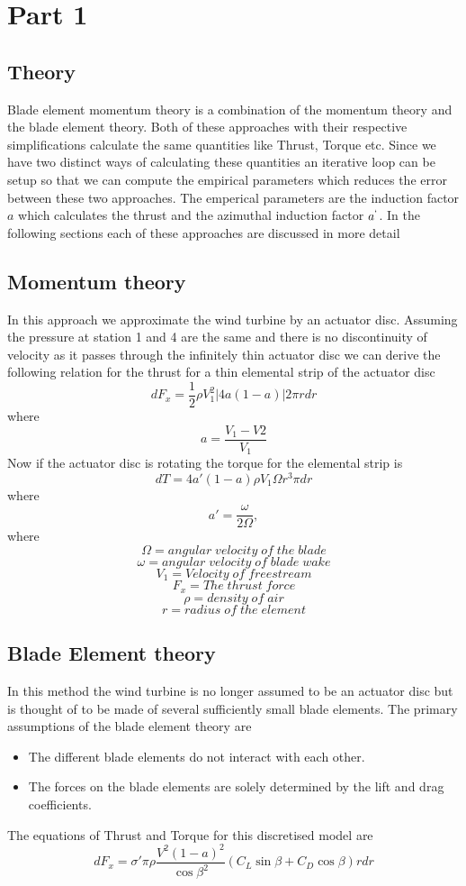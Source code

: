 \documentclass[main.tex]{subfiles}
\begin{document}
\section{Part 1}
\subsection{Theory}
Blade element momentum theory is a combination of the momentum theory and the blade element theory.
Both of these approaches with their respective simplifications calculate the same quantities like Thrust, Torque etc. Since we have two distinct ways of calculating these quantities an iterative loop can be setup so that we can compute the empirical parameters which reduces the error between these two approaches. The emperical parameters are the induction factor $a$ which calculates the thrust and the azimuthal induction factor $a^{`}$. In the following sections each of these approaches are discussed in more detail
\subsection{Momentum theory}
In this approach we approximate the wind turbine by an actuator disc. Assuming the pressure at station 1 and 4 are the same and there is no discontinuity of velocity as it passes through the infinitely thin actuator disc we can derive the following relation for the thrust for a thin elemental strip of the actuator disc
$$
dF_{x} = \frac{1}{2}  \rho V_{1}^{2}|{4a(1 - a)}|2\pi r dr
$$ 
where
$$ a = \frac{V_{1} - V{2}}{V_{1}}$$
Now if the actuator disc is rotating the torque for the elemental strip is 
$$
dT = 4a'(1 - a)\rho V_{1} \Omega r^{3} \pi dr
$$
where 
$$
a' = \frac{\omega}{2\Omega},  
$$
where
$$
\Omega = angular\;velocity\;of\;the\;blade
$$
$$
\omega = angular\;velocity\;of\;blade\;wake
$$
$$
V_{1} = Velocity\;of\;freestream
$$
$$
F_{x} = The\;thrust\;force
$$
$$
\rho = density\;of\;air
$$
$$
r = radius\;of\;the\;element
$$
\subsection{Blade Element theory}
In this method the wind turbine is no longer assumed to be an actuator disc but is thought of to be made of several sufficiently small blade elements. The primary assumptions of the blade element theory are 
\begin{itemize}
    \item The different blade elements do not interact with each other.
    \item The forces on the blade elements are solely determined by the lift and drag coefficients.
\end{itemize}
The equations of Thrust and Torque for this discretised model are
$$
dF_{x} = \sigma' \pi \rho \frac{V^{2}(1 - a)^2}{\cos{\beta}^2}(C_{L} \sin{\beta} + C_{D} \cos{\beta})rdr
$$
\end{document}
